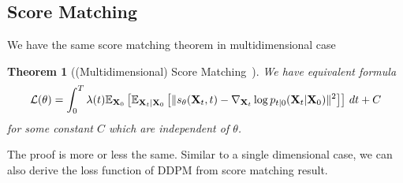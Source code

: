 \documentclass[11pt, a4paper]{article}
\newtheorem{theorem}{Theorem}
\newtheorem{lemma}{Lemma}
\begin{document}
\subsection{Score Matching}
We have the same score matching theorem in multidimensional case
\begin{theorem}[(Multidimensional) Score Matching~\cite{vincent2011connection}]
    We have equivalent formula
    \begin{align}
        {\cal L}(\theta) = \int_0^T \lambda(t) \mathbb{E}_{{\bf X}_0}\left[\mathbb{E}_{{\bf X}_t|{\bf X}_0}\left[ \| s_\theta({\bf X}_t, t)  - \nabla_{{\bf X}_t} \log p_{t|0}({\bf X}_t|{\bf X}_0)\|^2 \right]\right]\, dt + C
    \end{align}
    for some constant $C$ which are independent of $\theta$.
\end{theorem}
The proof is more or less the same.
Similar to a single dimensional case, we can also derive the loss function of DDPM from score matching result.

\end{document}
